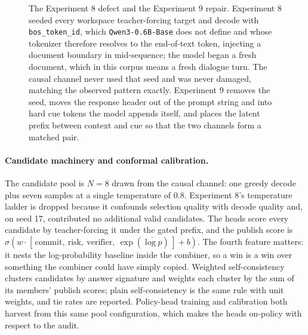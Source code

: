 \documentclass[10pt,a4paper]{article}
\begin{document}
\begin{figure}[htbp]
\caption{The Experiment 8 defect and the Experiment 9 repair. Experiment 8 seeded every
workspace teacher-forcing target and decode with \texttt{bos\_token\_id},
which \texttt{Qwen3-0.6B-Base} does not define and whose tokenizer therefore
resolves to the end-of-text token, injecting a document boundary in
mid-sequence; the model began a fresh document, which in this corpus means a
fresh dialogue turn. The causal channel never used that seed and was never
damaged, matching the observed pattern exactly. Experiment 9 removes the seed,
moves the response header out of the prompt string and into hard cue tokens
the model appends itself, and places the latent prefix between context and
cue so that the two channels form a matched pair.}
\label{fig:channel}
\end{figure}

\paragraph{Candidate machinery and conformal calibration.}
The candidate pool is $N=8$ drawn from the causal channel: one greedy
decode plus seven samples at a single temperature of $0.8$. Experiment 8's
temperature ladder is dropped because it confounds selection quality with
decode quality and, on seed 17, contributed no additional valid candidates.
The heads score every candidate by teacher-forcing it under the gated prefix,
and the publish score is
$\sigma(w \cdot [\,\text{commit},\ \text{risk},\ \text{verifier},\
\exp(\overline{\log p})\,] + b)$. The fourth feature matters: it nests the
log-probability baseline inside the combiner, so a win is a win over
something the combiner could have simply copied. Weighted self-consistency
clusters candidates by answer signature and weights each cluster by the sum
of its members' publish scores; plain self-consistency is the same rule with
unit weights, and tie rates are reported. Policy-head training and
calibration both harvest from this same pool configuration, which makes the
heads on-policy with respect to the audit.
\end{document}
